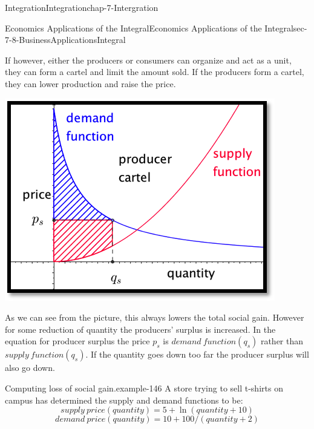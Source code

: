 \documentclass[oneside,10pt,]{book}
\numberwithin{equation}{section}
\begin{document}
\begin{chapterptx}{Integration}{}{Integration}{}{}{chap-7-Intergration}
\begin{sectionptx}{Economics Applications of the Integral}{}{Economics Applications of the Integral}{}{}{sec-7-8-BusinessApplicationsIntegral}
\begin{sidebyside}{1}{0.2}{0.2}{0}
\begin{sbspanel}{0.6}
\end{sbspanel}%
\end{sidebyside}%
\par
\hypertarget{p-3099}{}%
If however, either the producers or consumers can organize and act as a unit, they can form a cartel and limit the amount sold.  If the producers form a cartel, they can lower production and raise the price.%
\begin{sidebyside}{1}{0.2}{0.2}{0}%
\begin{sbspanel}{0.6}%
\includegraphics[width=1\linewidth]{images/sec7-8-9.png}
\end{sbspanel}%
\end{sidebyside}%
\par
\hypertarget{p-3100}{}%
As we can see from the picture, this always lowers the total social gain.  However for some reduction of quantity the producers’ surplus is increased.  In the equation for producer surplus the price \(p_s\) is \(demand\ function (q_s)\) rather than \(supply\ function (q_s)\).  If the quantity goes down too far the producer surplus will also go down.%
\begin{example}{Computing loss of social gain.}{example-146}%
\hypertarget{p-3101}{}%
A store trying to sell t-shirts on campus has determined the supply and demand functions to be:%
%
\begin{equation*}
supply\ price(quantity)=5+\ln (quantity+10)
\end{equation*}
%
\begin{equation*}
demand\ price(quantity)=10+100/(quantity+2)
\end{equation*}
\hypertarget{p-3102}{}%

\end{example}
\end{sectionptx}
\end{chapterptx}
\end{document}
